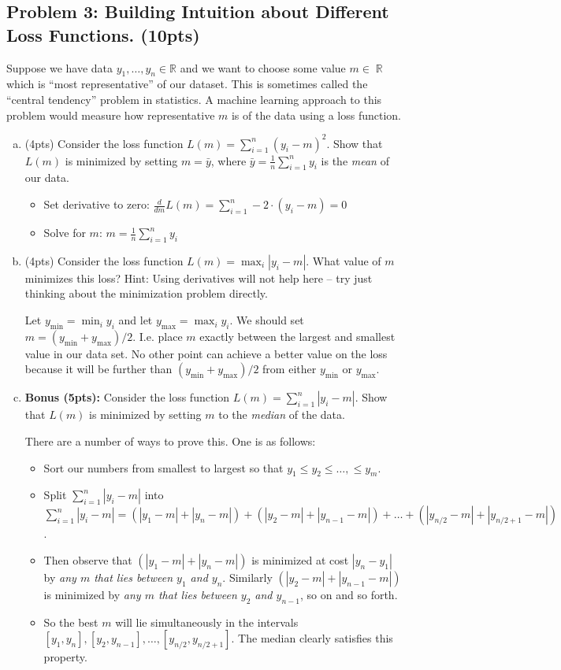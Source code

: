 \documentclass[10pt]{article}
\DeclareMathOperator{\R}{\mathbb{R}}
\begin{document}
\subsection{Problem 3: Building Intuition about Different Loss Functions. (10pts)}
Suppose we have data  $y_1, \ldots, y_n \in \mathbb{R}$ and we want to choose some value $m \in \R$ which is ``most representative'' of our dataset. This is sometimes called the ``central tendency'' problem in statistics. A machine learning approach to this problem would measure how representative $m$ is of the data using a loss function. 
\begin{enumerate}[(a)]
	\item (4pts) Consider the loss function $L(m) = \sum_{i=1}^n (y_i - m)^2$. Show that $L(m)$ is minimized by setting $m = \bar{y}$, where $\bar{y} = \frac{1}{n}\sum_{i=1}^n y_i$ is the \emph{mean} of our data. 
		\begin{itemize}
		\item Set derivative to zero: $\frac{d}{d m} L(m) = \sum_{i=1}^n -2\cdot(y_i - m) = 0$
		\item Solve for $m$: $m = \frac{1}{n}\sum_{i=1}^n y_i$
	\end{itemize}

	\item (4pts) Consider the loss function $L(m) = \max_i|y_i - m|$. What value of $m$ minimizes this loss? Hint: Using derivatives will not help here -- try just thinking about the minimization problem directly.
	
	Let $y_{\text{min}} = \min_i y_i$ and let  $y_{\text{max}} = \max_i y_i$. We should set $m = (y_{\text{min}} + y_{\text{max}})/2$. I.e. place $m$ exactly between the largest and smallest value in our data set. No other point can achieve a better value on the loss because it will be further than $(y_{\text{min}} + y_{\text{max}})/2$ from either $y_{\text{min}}$ or $y_{\text{max}}$.

	\item \textbf{Bonus (5pts):} Consider the loss function $L(m) = \sum_{i=1}^n |y_i - m|$. Show that $L(m)$ is minimized by setting $m$ to the \emph{median} of the data. 
	
	There are a number of ways to prove this. One is as follows:
	\begin{itemize}
		\item Sort our numbers from smallest to largest so that $y_1 \leq y_2 \leq \ldots, \leq y_m$.
		\item Split $\sum_{i=1}^n |y_i - m|$ into $\sum_{i=1}^n |y_i - m| = (|y_1 - m| + |y_n - m| ) + (|y_2 - m| + |y_{n-1} - m|) + \ldots + (|y_{n/2} - m| + |y_{n/2+1} - m|)$.
		\item Then observe that $(|y_1 - m| + |y_n - m| )$ is minimized at cost $|y_n - y_1|$ by \emph{any $m$ that lies between $y_1$ and $y_n$}. Similarly $(|y_2 - m| + |y_{n-1} - m| )$ is minimized by \emph{any $m$ that lies between $y_2$ and $y_{n-1}$}, so on and so forth. 
		\item So the best $m$ will lie simultaneously in the intervals $[y_1,y_n], [y_2,y_{n-1}],\ldots, [y_{n/2},y_{n/2 + 1}]$. The median clearly satisfies this property.
	\end{itemize}


\end{enumerate}
\end{document}
